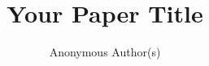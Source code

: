 \documentclass[10pt,twocolumn,letterpaper]{article}
\title{Your Paper Title}
\author{
  Anonymous Author(s)
}
\begin{document}
\maketitle








{\small


}
\end{document}
